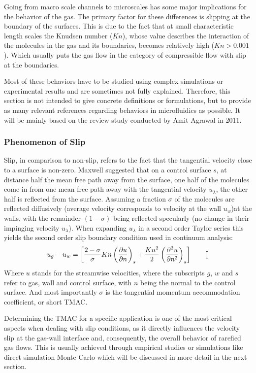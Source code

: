	Going from macro scale channels to microscales has some major implications for the behavior of the gas.
	The primary factor for these differences is slipping at the boundary of the surfaces.
	This is due to the fact that at small characteristic length scales the Knudsen number ($Kn$), whose value describes the interaction of the molecules in the gas and its boundaries, becomes relatively high ($Kn > 0.001$).
	Which usually puts the gas flow in the category of compressible flow with slip at the boundaries.

	Most of these behaviors have to be studied using complex simulations or experimental results and are sometimes not fully explained.
	Therefore, this section is not intended to give concrete definitions or formulations, but to provide as many relevant references regarding behaviors in microfluidics as possible.
	It will be mainly based on the review study conducted by Amit Agrawal in 2011.

\subsubsection*{Phenomenon of Slip}
	Slip, in comparison to non-slip, refers to the fact that the tangential velocity close to a surface is non-zero.
	Maxwell suggested that on a control surface $s$, at distance half the mean free path away from the surface, one half of the molecules come in from one mean free path away with the tangential velocity $u_\lambda$, the other half is reflected from the surface.
	Assuming a fraction $\sigma$ of the molecules are reflected diffusively (average velocity corresponds to velocity at the wall $u_w$)at the walls, with the remainder $(1-\sigma)$ being reflected specularly (no change in their impinging velocity $u_\lambda$).
	When expanding $u_\lambda$ in a second order Taylor series this yields the second order slip boundary condition used in continuum analysis:
	$$
		u_g - u_w =
		\left[
			\frac{2-\sigma}{\sigma}Kn\left(\frac{\partial u}{\partial n}\right)_s
			+ \frac{Kn^2}{2} \left(\frac{\partial^2 u}{\partial n^2}\right)_s
		\right]
		\qquad \eqref{}
	$$ 
	Where $u$ stands for the streamwise velocities, where the subscripts $g$, $w$ and $s$ refer to gas, wall and control surface, with $n$ being the normal to the control surface.
	And most importantly $\sigma$ is the tangential momentum accommodation coefficient, or short TMAC.

	Determining the TMAC for a specific application is one of the most critical aspects when dealing with slip conditions, as it directly influences the velocity slip at the gas-wall interface and, consequently, the overall behavior of rarefied gas flows.
	This is usually achieved through empirical studies or simulations like direct simulation Monte Carlo which will be discussed in more detail in the next section.

